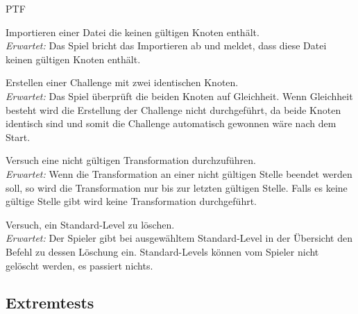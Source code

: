 \begin{ids}{\gls{PTF}}

	\id[500] Importieren einer Datei die keinen gültigen Knoten enthält.\\
	
	\textit{Erwartet:} Das Spiel bricht das Importieren ab und meldet, dass diese Datei keinen gültigen Knoten enthält.
	
	\id[510] Erstellen einer Challenge mit zwei identischen Knoten.\\
	
	\textit{Erwartet:} Das Spiel überprüft die beiden Knoten auf Gleichheit. Wenn Gleichheit besteht wird die Erstellung der Challenge nicht durchgeführt, da beide Knoten identisch sind und somit die Challenge automatisch gewonnen wäre nach dem Start.
	
	\id[520] Versuch eine nicht gültigen Transformation durchzuführen.\\
	
	\textit{Erwartet:} Wenn die Transformation an einer nicht gültigen Stelle beendet werden soll, so wird die Transformation nur bis zur letzten gültigen Stelle. Falls es keine gültige Stelle gibt wird keine Transformation durchgeführt.
	
	\id[530] Versuch, ein Standard-Level zu löschen.\\
	
	\textit{Erwartet:} Der Spieler gibt bei ausgewähltem Standard-Level in der Übersicht den Befehl zu dessen Löschung ein. Standard-Levels können vom Spieler nicht gelöscht werden, es passiert nichts.

\end{ids}


\clearpage


%
%
\subsection{Extremtests}

\vspace{1em}

